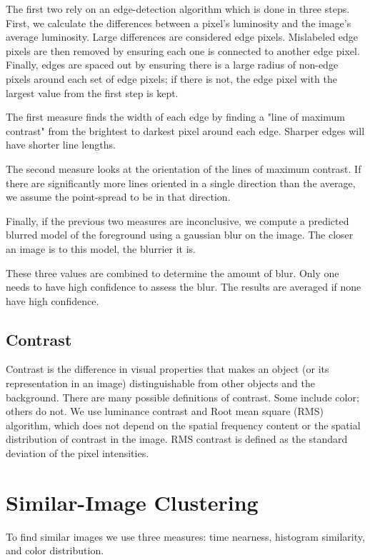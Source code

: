 \documentclass{article}
\begin{document}
The first two rely on an edge-detection algorithm which is done in three steps. First, we calculate the differences between a pixel's luminosity and the image's average luminosity. Large differences are considered edge pixels. Mislabeled edge pixels are then removed by ensuring each one is connected to another edge pixel. Finally, edges are spaced out by ensuring there is a large radius of non-edge pixels around each set of edge pixels; if there is not, the edge pixel with the largest value from the first step is kept. %

The first measure finds the width of each edge by finding a "line of maximum contrast" from the brightest to darkest pixel around each edge. Sharper edges will have shorter line lengths.

The second measure looks at the orientation of the lines of maximum contrast. If there are significantly more lines oriented in a single direction than the average, we assume the point-spread to be in that direction. %

Finally, if the previous two measures are inconclusive, we compute a predicted blurred model of the foreground using a gaussian blur on the image. The closer an image is to this model, the blurrier it is.

These three values are combined to determine the amount of blur. Only one needs to have high confidence to assess the blur. The results are averaged if none have high confidence.%


\subsection{Contrast}

Contrast is the difference in visual properties that makes an object (or its representation in an image) distinguishable from other objects and the background.
There are many possible definitions of contrast. Some include color; others do not. We use luminance contrast and
Root mean square (RMS) algorithm, which does not depend on the spatial frequency content or the spatial distribution of contrast in the image. 
RMS contrast is defined as the standard deviation of the pixel intensities\cite{ppr:1982}.

\section{Similar-Image Clustering}
To find similar images we use three measures: time nearness, histogram similarity, and color distribution.
\end{document}
